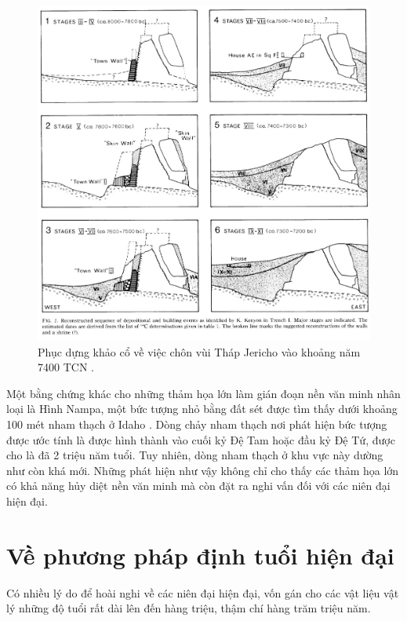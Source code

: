 \documentclass[10pt,twocolumn,letterpaper]{article}
\begin{document}
\begin{figure}[t]
\begin{center}
   \includegraphics[width=1\linewidth]{jericho.jpg}
\end{center}
   \caption{Phục dựng khảo cổ về việc chôn vùi Tháp Jericho vào khoảng năm 7400 TCN \cite{95}.}
\label{fig:14}
\label{fig:onecol}
\end{figure}

Một bằng chứng khác cho những thảm họa lớn làm gián đoạn nền văn minh nhân loại là Hình Nampa, một bức tượng nhỏ bằng đất sét được tìm thấy dưới khoảng 100 mét nham thạch ở Idaho \cite{102,103}. Dòng chảy nham thạch nơi phát hiện bức tượng được ước tính là được hình thành vào cuối kỷ Đệ Tam hoặc đầu kỷ Đệ Tứ, được cho là đã 2 triệu năm tuổi. Tuy nhiên, dòng nham thạch ở khu vực này dường như còn khá mới. Những phát hiện như vậy không chỉ cho thấy các thảm họa lớn có khả năng hủy diệt nền văn minh mà còn đặt ra nghi vấn đối với các niên đại hiện đại.

\section{Về phương pháp định tuổi hiện đại}

Có nhiều lý do để hoài nghi về các niên đại hiện đại, vốn gán cho các vật liệu vật lý những độ tuổi rất dài lên đến hàng triệu, thậm chí hàng trăm triệu năm.
\end{document}
